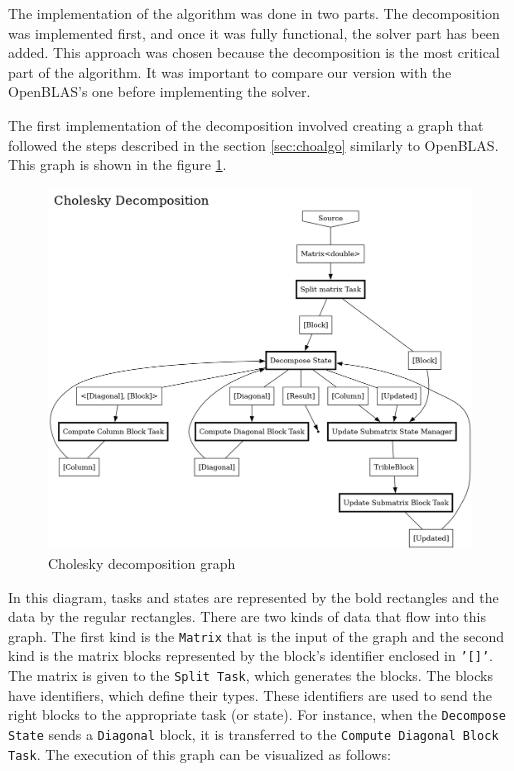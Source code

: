 The implementation of the algorithm was done in two parts. The decomposition was
implemented first, and once it was fully functional, the solver part has been
added. This approach was chosen because the decomposition is the most critical
part of the algorithm. It was important to compare our version with the
OpenBLAS's one before implementing the solver.

The first implementation of the decomposition involved creating a graph that
followed the steps described in the section \ref{sec:choalgo} similarly to
OpenBLAS. This graph is shown in the figure \ref{fig:chograph}.

\begin{figure}[!ht]
  \begin{center}
    \includegraphics[scale=0.3]{img/cho-img/decompose_graph.png}
    \caption{Cholesky decomposition graph}
    \label{fig:chograph}
  \end{center}
\end{figure}

In this diagram, tasks and states are represented by the bold rectangles and the
data by the regular rectangles. There are two kinds of data that flow into this
graph. The first kind is the \texttt{Matrix} that is the input of the graph and
the second kind is the matrix blocks represented by the block's identifier
enclosed in \texttt{'[]'}. The matrix is given to the \texttt{Split Task}, which
generates the blocks. The blocks have identifiers, which define their types.
These identifiers are used to send the right blocks to the appropriate task (or
state). For instance, when the \texttt{Decompose State} sends a
\texttt{Diagonal} block, it is transferred to the \texttt{Compute Diagonal Block
Task}. The execution of this graph can be visualized as follows:

